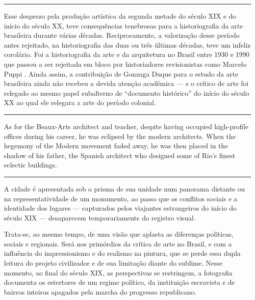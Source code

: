 \begin{center}\rule{0.5\linewidth}{0.5pt}\end{center}

Esse desprezo pela produção artística da segunda metade do século XIX e
do início do século XX, teve consequências tenebrosas para a
historiografia da arte brasileira durante várias décadas.
Reciprocamente, a valorização desse período antes rejeitado, na
historiografia das duas ou três últimas décadas, teve um infeliz
corolário. Foi a historiografia da arte e da arquitetura no Brasil entre
1930 e 1990 que passou a ser rejeitada em bloco por historiadores
revisionistas como Marcelo Puppi \autocite{puppi:1998historia}. Ainda
assim, a contribuição de Gonzaga Duque para o estudo da arte brasileira
ainda não recebeu a devida atenção acadêmica --- e o crítico de arte foi
relegado ao mesmo papel subalterno de ``documento histórico'' do início
do século XX ao qual ele relegara a arte do período colonial.

\begin{center}\rule{0.5\linewidth}{0.5pt}\end{center}

As for the Beaux-Arts architect and teacher, despite having occupied
high-profile offices during his career, he was eclipsed by the modern
architects. When the hegemony of the Modern movement faded away, he was
then placed in the shadow of his father, the Spanish architect who
designed some of Rio's finest eclectic buildings.

\begin{center}\rule{0.5\linewidth}{0.5pt}\end{center}

A cidade é apresentada sob o prisma de sua unidade num panorama distante
ou na representatividade de um monumento, ao passo que os conflitos
sociais e a identidade dos lugares --- capturados pelos viajantes
estrangeiros do início do século XIX --- desaparecem temporariamente do
registro visual.

Trata-se, ao mesmo tempo, de uma visão que aplasta as diferenças
políticas, sociais e regionais. Será nos primórdios da crítica de arte
no Brasil, e com a influência do impressionismo e do realismo na
pintura, que se perde essa dupla leitura do projeto civilizador e de sua
limitação diante do sublime. Nesse momento, ao final do século XIX, as
perspectivas se restringem, a fotografia documenta os estertores de um
regime político, da instituição escravista e de bairros inteiros
apagados pela marcha do progresso republicano.
